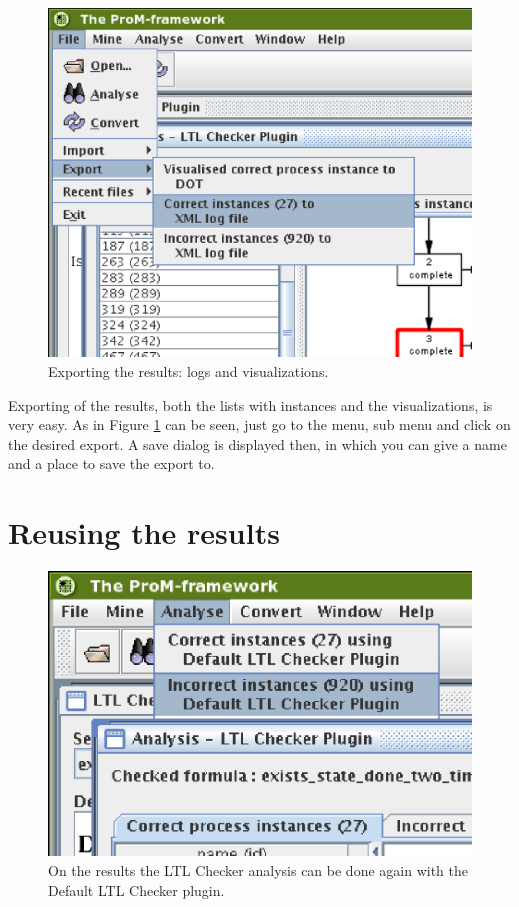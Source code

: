 \begin{figure}[H]
    \includegraphics[scale=0.5]{images/framework-results-exportmenu-cutted.eps}
    \caption{Exporting the results: logs and visualizations.}
    \label{plugingui:export}
\end{figure}

Exporting of the results, both the lists with instances and the
visualizations, is very easy. As in Figure \ref{plugingui:export} can be seen,
just go to the  menu, sub menu  and click on the desired
export. A save dialog is displayed then, in which you can give a name and a place to save the export to.

\section{Reusing the results}
\label{plugingui:reusing}

\begin{figure}[H]
    \includegraphics[scale=0.5]{images/framework-results-defaultmenu-cutted.eps}
    \caption{On the results the LTL Checker analysis can be done again with
    the Default LTL Checker plugin.}
    \label{plugingui:defaultagain}
\end{figure}

